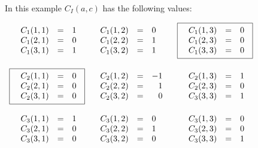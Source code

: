 In this example $C_I(a,c)$ has the following values:
\begin{center}
$\begin{array}{lll}

\makebox[1.25in]{
$\begin{array}{llr}
C_1(1,1) & = & 1 \\
C_1(2,1) & = & 0\\
C_1(3,1) & = & 1
\end{array}$}
&
\makebox[1.25in][l]{
$\begin{array}{llr}
C_1(1,2) & = & 0 \\
C_1(2,2) & = & 1 \\
C_1(3,2) & = & 1
\end{array}$}
&
\framebox[1.25in]{
$\begin{array}{llr}
C_1(1,3) & = & 0 \\
C_1(2,3) &= & 0 \\
C_1(3,3) & = & 0
\end{array}$}
\\
\\
\framebox[1.25in]{
$\begin{array}{llr}
C_2(1,1) & = & 0 \\
C_2(2,1) & = & 0 \\
C_2(3,1) & = & 0 \\
\end{array}$}
&
\makebox[1.25in][l]{
$\begin{array}{llr}
C_2(1,2) & = & -1 \\
C_2(2,2) & = & 1 \\
C_2(3,2) & = & 0
\end{array}$}
&
\makebox[1.25in]{
$\begin{array}{llr}
C_2(1,3) & = & 1 \\
C_2(2,3) & = & 0 \\
C_3(3,3) & = & 1
\end{array}$}
\\
\\
\makebox[1.25in]{
$\begin{array}{llr}
C_3(1,1) & = & 1 \\
C_3(2,1) & = & 0 \\
C_3(3,1) & = & 0
\end{array}$}
&
\makebox[1.25in][l]{
$\begin{array}{llr}
C_3(1,2) & = & 0 \\
C_3(2,2) & = & 1 \\
C_3(3,2) & = & 0
\end{array}$}
&
\makebox[1.25in]{
$\begin{array}{llr}
C_3(1,3) & = & 0 \\
C_3(2,3) & = & 0 \\
C_3(3,3) & = & 1
\end{array}$}
\end{array}$
\end{center}

